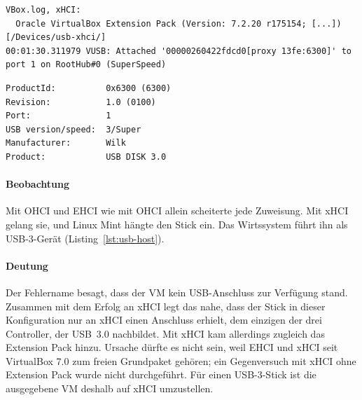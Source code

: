 \begin{messung}
\begin{lstlisting}[caption={Auszug aus den Protokolldateien der VM, Zeilen gekürzt},label={lst:usb-log}]
VBox.log, xHCI:
  Oracle VirtualBox Extension Pack (Version: 7.2.20 r175154; [...])
[/Devices/usb-xhci/]
00:01:30.311979 VUSB: Attached '00000260422fdcd0[proxy 13fe:6300]' to port 1 on RootHub#0 (SuperSpeed)
\end{lstlisting}

\begin{lstlisting}[caption={Eintrag des Sticks in \texttt{VBoxManage list usbhost}, Auszug ohne Seriennummer},label={lst:usb-host}]
ProductId:          0x6300 (6300)
Revision:           1.0 (0100)
Port:               1
USB version/speed:  3/Super
Manufacturer:       Wilk
Product:            USB DISK 3.0
\end{lstlisting}




\paragraph{Beobachtung} Mit OHCI und EHCI wie mit OHCI allein scheiterte jede Zuweisung. Mit xHCI gelang sie, und Linux Mint hängte den Stick ein. Das Wirtssystem führt ihn als USB-3-Gerät (Listing~\ref{lst:usb-host}).

\paragraph{Deutung} Der Fehlername besagt, dass der VM kein USB-Anschluss zur Verfügung stand. Zusammen mit dem Erfolg an xHCI legt das nahe, dass der Stick in dieser Konfiguration nur an xHCI einen Anschluss erhielt, dem einzigen der drei Controller, der USB~3.0 nachbildet. Mit xHCI kam allerdings zugleich das Extension Pack hinzu. Ursache dürfte es nicht sein, weil EHCI und xHCI seit VirtualBox 7.0 zum freien Grundpaket gehören; ein Gegenversuch mit xHCI ohne Extension Pack wurde nicht durchgeführt. Für einen USB-3-Stick ist die ausgegebene VM deshalb auf xHCI umzustellen.
\end{messung}

